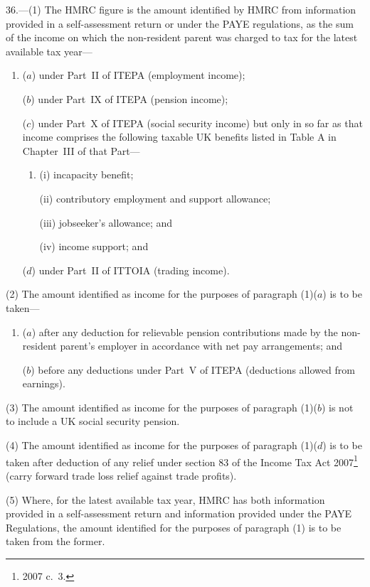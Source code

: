 \documentclass[12pt,a4paper]{article}
\begin{document}
36.---(1)  The HMRC figure is the amount identified by HMRC from information provided in a self-assessment return or under the PAYE regulations, as the sum of the income on which the non-resident parent was charged to tax for the latest available tax year—
\begin{enumerate}\item[]
($a$) under Part~II of ITEPA (employment income);

($b$) under Part~IX of ITEPA (pension income);

($c$) under Part~X of ITEPA (social security income) but only in so far as that income comprises the following taxable UK benefits listed in Table A in Chapter~III of that Part—
\begin{enumerate}\item[]
(i) incapacity benefit;

(ii) contributory employment and support allowance;

(iii) jobseeker’s allowance; and

(iv) income support; and
\end{enumerate}

($d$) under Part~II of ITTOIA (trading income).
\end{enumerate}

(2) The amount identified as income for the purposes of paragraph (1)($a$)  is to be taken—
\begin{enumerate}\item[]
($a$) after any deduction for relievable pension contributions made by the non-resident parent’s employer in accordance with net pay arrangements; and

($b$) before any deductions under Part~V of ITEPA (deductions allowed from earnings).
\end{enumerate}

(3) The amount identified as income for the purposes of paragraph (1)($b$)  is not to include a UK social security pension.

(4) The amount identified as income for the purposes of paragraph (1)($d$)  is to be taken after deduction of any relief under section 83 of the Income Tax Act 2007\footnote{2007 c.~3.} (carry forward trade loss relief against trade profits).

(5) Where, for the latest available tax year, HMRC has both information provided in a self-assessment return and information provided under the PAYE Regulations, the amount identified for the purposes of paragraph (1) is to be taken from the former.
\end{document}
